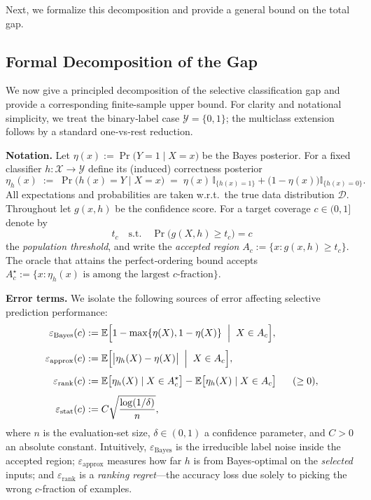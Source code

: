 Next, we formalize this decomposition and provide a general bound on the total gap.

\subsection{Formal Decomposition of the Gap}
\label{sec:formal-gap}

We now give a principled decomposition of the selective classification gap and provide a corresponding finite-sample upper bound. For clarity and notational simplicity, we treat the binary‑label case \(\mathcal{Y}=\{0,1\}\); the multiclass extension follows by a standard one‑vs‑rest reduction.

\textbf{Notation.} Let \(\eta(x):=\Pr\bigl(Y=1\mid X=x\bigr)\) be the Bayes posterior.
For a fixed classifier \(h:\mathcal{X}\to\mathcal{Y}\) define its
(induced) correctness posterior
\begin{equation}
  \eta_h(x)\;:=\;\Pr\bigl(h(x)=Y\mid X=x\bigr)
  \;=\;\eta(x)\,\mathbb{I}_{\{h(x)=1\}}+
        \bigl(1-\eta(x)\bigr)\mathbb{I}_{\{h(x)=0\}}.
\end{equation}
All expectations and probabilities are taken w.r.t.\ the true data distribution
\(\mathcal{D}\). Throughout let \(g(x,h)\) be the confidence score.
For a target coverage \(c\in(0,1]\) denote by
\begin{equation}
  t_c \quad \text{s.t.}\quad
  \Pr\bigl(g(X,h)\ge t_c\bigr)=c
\end{equation}
the \emph{population threshold}, and write the
\emph{accepted region}
\(A_c:=\{x:g(x,h)\ge t_c\}\).  
The oracle that attains the perfect‑ordering bound accepts $A_c^{\star}:=\bigl\{x:\eta_h(x)\text{ is among the largest }c\text{-fraction}\bigr\}$.

\textbf{Error terms.} We isolate the following sources of error affecting selective prediction performance:
\begin{align}
\varepsilon_{\text{Bayes}}(c)
&:=\mathbb{E}\Bigl[1-\max\{\eta(X),1-\eta(X)\}\;\Bigm|\;X\in A_c\Bigr],
\\[4pt]
\varepsilon_{\text{approx}}(c)
&:=\mathbb{E}\Bigl[\bigl|\eta_h(X)-\eta(X)\bigr|\;\Bigm|\;X\in A_c\Bigr],
\\[4pt]
\varepsilon_{\text{rank}}(c)
&:=\mathbb{E}\bigl[\eta_h(X)\mid X\in A_c^{\star}\bigr]
  -\mathbb{E}\bigl[\eta_h(X)\mid X\in A_c\bigr]\;\;\;\;\;\;(\ge0),
\\[4pt]
\varepsilon_{\text{stat}}(c)
&:=C\sqrt{\frac{\log(1/\delta)}{n}},
\end{align}
where \(n\) is the evaluation‑set size, \(\delta\in(0,1)\) a confidence
parameter, and \(C>0\) an absolute constant. Intuitively, \(\varepsilon_{\text{Bayes}}\) is the irreducible label noise inside the accepted region; \(\varepsilon_{\text{approx}}\) measures how far \(h\) is from Bayes‑optimal on the \emph{selected} inputs; and \(\varepsilon_{\text{rank}}\) is a \emph{ranking regret}—the accuracy loss due solely to picking the wrong \(c\)-fraction of examples.


